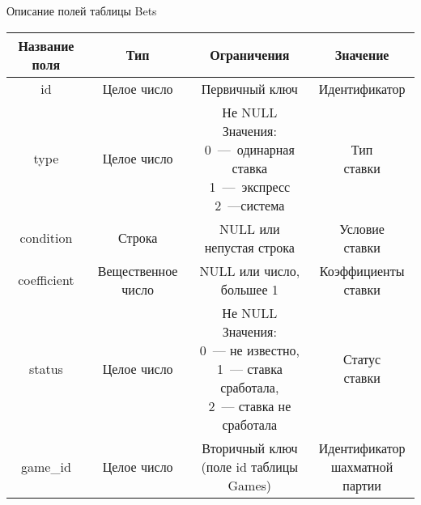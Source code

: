 \begin{center}
	\begin{threeparttable}
		\captionsetup{justification=raggedright,singlelinecheck=off}
		\caption{\label{bets_table}Описание полей таблицы Bets}
		\centering
		\begin{tabular}{|c|c|c|c|}
			\hline
			Название поля & Тип & Ограничения & Значение \\
			\hline
			id & Целое число & Первичный ключ & Идентификатор \\
			\hline
			type & Целое число & \specialcell{Не NULL\\Значения:\\0~---~одинарная ставка\\1~---~экспресс\\2~---система} & \specialcell{Тип\\ставки} \\
			\hline
			condition & Строка & \specialcell{NULL или\\непустая строка} & \specialcell{Условие\\ставки}\\
			\hline
			coefficient & Вещественное число & \specialcell{NULL или число,\\ большее 1} & \specialcell{Коэффициенты\\ставки}\\
			\hline
			status & Целое число & \specialcell{Не NULL\\Значения:\\0~--- не известно,\\1~--- ставка сработала,\\2~--- ставка не сработала} & \specialcell{Статус\\ставки}\\
			\hline
			game\_id & Целое число & \specialcell{Вторичный ключ\\(поле id таблицы Games)} & \specialcell{Идентификатор\\шахматной партии}\\
			\hline
		\end{tabular}
	\end{threeparttable}
\end{center}
